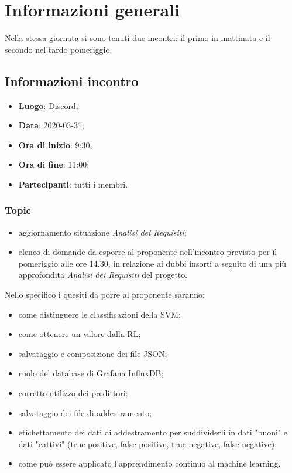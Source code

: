 \section{Informazioni generali}
Nella stessa giornata si sono tenuti due incontri: il primo in mattinata e il secondo nel tardo pomeriggio.
\subsection{Informazioni incontro}
\begin{itemize}
\item \textbf{Luogo}: Discord;
\item \textbf{Data}: 2020-03-31;
\item \textbf{Ora di inizio}: 9:30;
\item \textbf{Ora di fine}: 11:00;
\item \textbf{Partecipanti}: tutti i membri.
\end{itemize}

\subsubsection{Topic}
\begin{itemize}
\item aggiornamento situazione \textit{Analisi dei Requisiti};
\item elenco di domande da esporre al proponente nell'incontro previsto per il pomeriggio alle ore 14.30, in relazione ai dubbi insorti a seguito di una più approfondita \textit{Analisi dei Requisiti} del progetto.
\end{itemize}

Nello specifico i quesiti da porre al proponente saranno:
\begin{itemize}
	\item come distinguere le classificazioni della SVM;
	\item come ottenere un valore dalla RL;
	\item salvataggio e composizione dei file JSON;
	\item ruolo del database di Grafana InfluxDB;
	\item corretto utilizzo dei predittori;
	\item salvataggio dei file di addestramento;
	\item etichettamento dei dati di addestramento per suddividerli in dati "buoni" e dati "cattivi" (true positive, false positive, true negative, false negative);
	\item come può essere applicato l'apprendimento continuo al machine learning.
\end{itemize}
